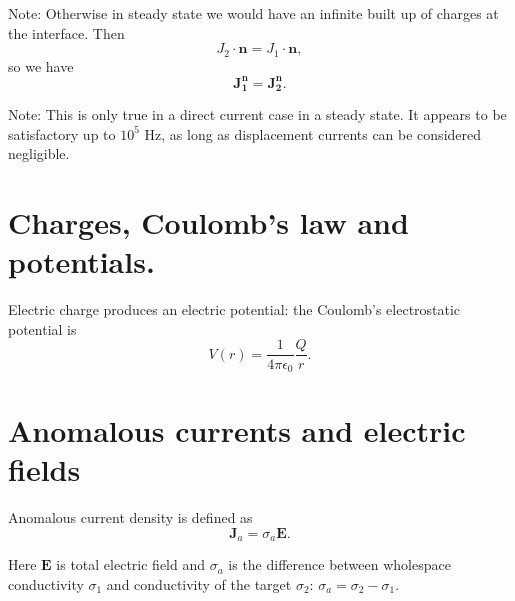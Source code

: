 \documentclass[11pt,letterpaper,leqno]{amsart}
\numberwithin{equation}{section}
\begin{document}
Note: Otherwise in steady state we would have an infinite built up of charges at the interface. 
Then 
\begin{equation} 
J_2 \cdot \mathbf{n} = J_1 \cdot \mathbf{n},
 \end{equation}
so we have 
\begin{equation}
\mathbf{J_1^n=J_2^n}.
\end{equation}


Note: This is only true in a direct current case in a steady state. It appears to be satisfactory up to $10^5$ Hz, as long as displacement currents can be considered negligible.


\section{Charges, Coulomb's law and potentials.}

Electric charge produces an electric potential: the Coulomb's electrostatic potential is
\begin{equation}
V(r) = \frac{1}{4\pi\epsilon_0}\frac{Q}{r}.
\end{equation}



\section{Anomalous currents and electric fields}

Anomalous current density is defined as 
\begin{equation}
\mathbf{J}_a = \sigma_a\mathbf{E}.
\end{equation}


Here $\mathbf{E}$ is total electric field and $\sigma_a$ is the difference between wholespace conductivity $\sigma_1$ and conductivity of the target $\sigma_2$: $\sigma_a = \sigma_2-\sigma_1$.




 \vspace{0.4cm}
\end{document}
